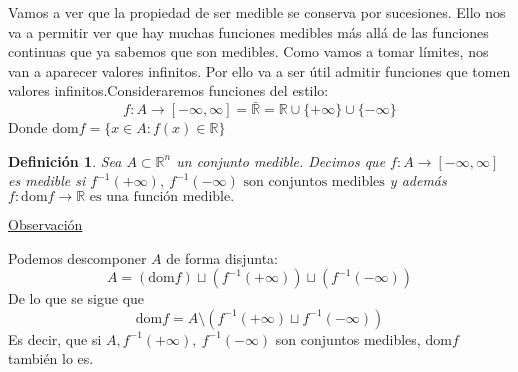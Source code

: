 \documentclass[10pt,a4paper,openright]{book}
\theoremstyle{break}
\newtheorem*{defi}{Definición}
\begin{document}
Vamos a ver que la propiedad de ser medible se conserva por sucesiones. Ello nos va a permitir ver que hay muchas funciones medibles
más allá de las funciones continuas que ya sabemos que son medibles.
Como vamos a tomar límites, nos van a aparecer valores infinitos. Por
ello va a ser útil admitir funciones que tomen valores infinitos.Consideraremos funciones del estilo:
$$f: A \to \left[-\infty, \infty\right] = \bar{\mathbb{R}} = \mathbb{R} \cup \{+\infty\} \cup \{-\infty\}$$
Donde $\mathrm{dom}f = \{x \in A: f\left(x\right) \in \mathbb{R}\}$

\begin{defi}
Sea $A \subset \mathbb{R}^n$ un conjunto medible. Decimos que $f: A \rightarrow \left[-\infty, \infty\right]$ es medible si $f^{-1}\left(+\infty\right),\ f^{-1}\left(-\infty\right) \text{ son conjuntos medibles}$ y además
$f : \mathrm{dom}f  \rightarrow \mathbb{R} \text{ es una función medible}.$
\end{defi}

\underline{Observación}

Podemos descomponer $A$ de forma disjunta:
$$A = \left( \mathrm{dom}f \right) \sqcup \left( f^{-1}\left(+\infty\right)\right) \sqcup \left( f^{-1}\left(-\infty\right)\right) $$
De lo que se sigue que
$$\mathrm{dom}f = A \setminus \left(  f^{-1}\left(+\infty\right) \sqcup  f^{-1}\left(-\infty \right) \right)$$
Es decir, que si $A, f^{-1}\left(+\infty\right),\ f^{-1}\left(-\infty\right)$ son conjuntos medibles, $\mathrm{dom}f$ también lo es.
\end{document}
